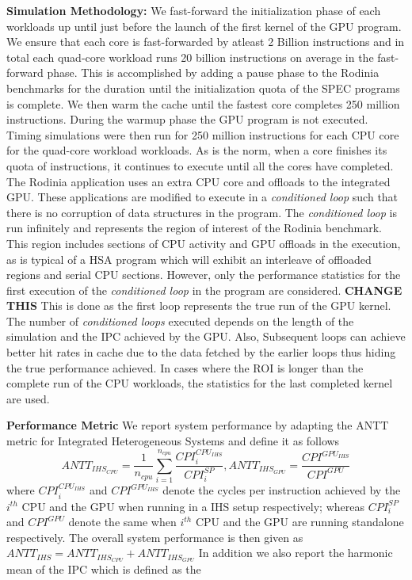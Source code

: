 \par \textbf{Simulation Methodology:} We fast-forward the initialization phase of each workloads up until just before the launch of the first kernel of the GPU program. We ensure that each core is fast-forwarded by atleast 2 Billion instructions and in total each quad-core workload runs 20 billion instructions on average in the fast-forward phase. This is accomplished by adding a pause phase to the Rodinia benchmarks for the duration until the initialization quota of the SPEC programs is complete. We then warm the cache until the fastest core completes 250 million instructions. During the warmup phase the GPU program is not executed. Timing simulations were then run for 250 million instructions for each CPU core for the quad-core workload workloads. As is the norm, when a core finishes its quota of instructions, it continues to execute until all the cores have completed. \\
The Rodinia application uses an extra CPU core and offloads to the integrated GPU. These applications are modified to execute in a \textit{conditioned loop} such that there is no corruption of data structures in the program. The \textit{conditioned loop} is run infinitely and represents the region of interest of the Rodinia benchmark. This region includes sections of CPU activity and GPU offloads in the execution, as is typical of a HSA program which will exhibit an interleave of offloaded regions and serial CPU sections. However, only the performance statistics for the first execution of the \textit{conditioned loop} in the program are considered. 
\textbf{CHANGE THIS} This is done as the first loop represents the true run of the GPU kernel. The number of \textit{conditioned loops} executed depends on the length of the simulation and the IPC achieved by the GPU. Also, Subsequent loops can achieve better hit rates in cache due to the data fetched by the earlier loops thus hiding the true performance achieved.
In cases where the ROI is longer than the complete run of the CPU workloads, the statistics for the last completed kernel are used. 
\par \textbf{Performance Metric} We report system performance by adapting the ANTT \cite{antt} metric for Integrated Heterogeneous Systems and define it as follows
\begin{equation}
ANTT_{IHS_{CPU}} = \frac{1}{n_{cpu}} \sum_{i=1}^{n_{cpu}} \frac{CPI_i^{CPU_{IHS}}}{CPI_i^{SP}},
ANTT_{IHS_{GPU}} = \frac{CPI^{GPU_{IHS}}}{CPI^{GPU}}
\end{equation}
where ${CPI_i^{CPU_{IHS}}}$ and $CPI^{GPU_{IHS}}$ denote the cycles per instruction achieved by the $i^{th}$ CPU and the GPU when running in a IHS setup respectively; whereas $CPI_i^{SP}$ and $CPI^{GPU}$ denote the same when $i^{th}$ CPU and the GPU are running standalone respectively. The overall system performance is then given as $ANTT_{IHS} = ANTT_{IHS_{CPU}} + ANTT_{IHS_{GPU}} $
In addition we also report the harmonic mean of the IPC which is defined as the 

